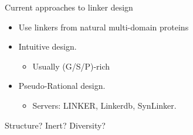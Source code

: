 \documentclass{beamer}
\begin{document}



\begin{frame}{Current approaches to linker design}
\begin{itemize}

\item Use linkers from natural multi-domain proteins


\item Intuitive design.
 \begin{itemize}
  \item Usually (G/S/P)-rich 
  \end{itemize}
\item Pseudo-Rational design. 
\begin{itemize}
 \item Servers: LINKER, Linkerdb, SynLinker.
\end{itemize}
\end{itemize}
\vspace{20px}
\LARGE{Structure? Inert? Diversity?}
\end{frame}














\end{document}
